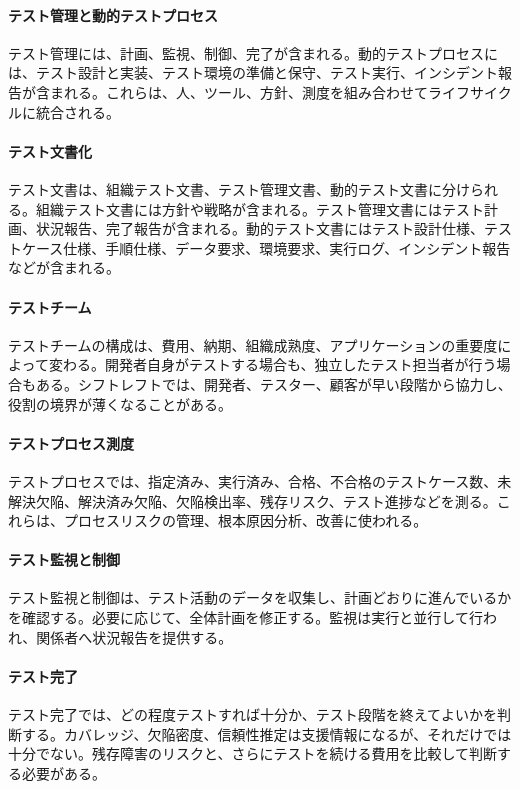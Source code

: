 \documentclass[a4paper,11pt]{ltjsarticle}
\numberwithin{figure}{section}
\numberwithin{table}{section}
\begin{document}
\paragraph{テスト管理と動的テストプロセス}
テスト管理には、計画、監視、制御、完了が含まれる。動的テストプロセスには、テスト設計と実装、テスト環境の準備と保守、テスト実行、インシデント報告が含まれる。これらは、人、ツール、方針、測度を組み合わせてライフサイクルに統合される。

\paragraph{テスト文書化}
テスト文書は、組織テスト文書、テスト管理文書、動的テスト文書に分けられる。組織テスト文書には方針や戦略が含まれる。テスト管理文書にはテスト計画、状況報告、完了報告が含まれる。動的テスト文書にはテスト設計仕様、テストケース仕様、手順仕様、データ要求、環境要求、実行ログ、インシデント報告などが含まれる。

\paragraph{テストチーム}
テストチームの構成は、費用、納期、組織成熟度、アプリケーションの重要度によって変わる。開発者自身がテストする場合も、独立したテスト担当者が行う場合もある。シフトレフトでは、開発者、テスター、顧客が早い段階から協力し、役割の境界が薄くなることがある。

\paragraph{テストプロセス測度}
テストプロセスでは、指定済み、実行済み、合格、不合格のテストケース数、未解決欠陥、解決済み欠陥、欠陥検出率、残存リスク、テスト進捗などを測る。これらは、プロセスリスクの管理、根本原因分析、改善に使われる。

\paragraph{テスト監視と制御}
テスト監視と制御は、テスト活動のデータを収集し、計画どおりに進んでいるかを確認する。必要に応じて、全体計画を修正する。監視は実行と並行して行われ、関係者へ状況報告を提供する。

\paragraph{テスト完了}
テスト完了では、どの程度テストすれば十分か、テスト段階を終えてよいかを判断する。カバレッジ、欠陥密度、信頼性推定は支援情報になるが、それだけでは十分でない。残存障害のリスクと、さらにテストを続ける費用を比較して判断する必要がある。
\end{document}

